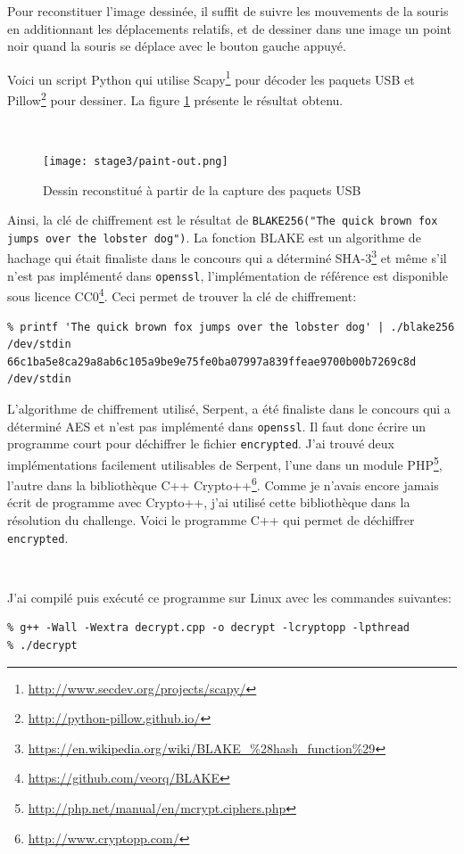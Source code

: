 \documentclass[a4paper,10pt]{article}
\newcommand{\pyinput}[1]{%
    \noindent{\color[rgb]{0.5, 0.5, 0.5}{\rule{\textwidth}{0.4pt}}}
     \\
    \noindent{\color[rgb]{0.5, 0.5, 0.5}{\rule{\textwidth}{0.4pt}}}
}
\begin{document}
Pour reconstituer l'image dessinée, il suffit de suivre les mouvements de la souris en additionnant les déplacements relatifs, et de dessiner dans une image un point noir quand la souris se déplace avec le bouton gauche appuyé.

Voici un script Python qui utilise Scapy\footnote{\url{http://www.secdev.org/projects/scapy/}} pour décoder les paquets USB et Pillow\footnote{\url{http://python-pillow.github.io/}} pour dessiner. La figure \ref{fig-paint-out} présente le résultat obtenu.

\pyinput{stage3/decode_paint.py.inc.tex}

\begin{figure}[ht]
  \centering
  \texttt{[image: stage3/paint-out.png]}
  \caption{Dessin reconstitué à partir de la capture des paquets USB}
  \label{fig-paint-out}
\end{figure}

Ainsi, la clé de chiffrement est le résultat de \texttt{BLAKE256("The quick brown fox jumps over the lobster dog")}.
La fonction BLAKE est un algorithme de hachage qui était finaliste dans le concours qui a déterminé SHA-3\footnote{\url{https://en.wikipedia.org/wiki/BLAKE_\%28hash_function\%29}} et même s'il n'est pas implémenté dans \texttt{openssl}, l'implémentation de référence est disponible sous licence CC0\footnote{\url{https://github.com/veorq/BLAKE}}.
Ceci permet de trouver la clé de chiffrement:
\begin{verbatim}
% printf 'The quick brown fox jumps over the lobster dog' | ./blake256 /dev/stdin
66c1ba5e8ca29a8ab6c105a9be9e75fe0ba07997a839ffeae9700b00b7269c8d /dev/stdin
\end{verbatim}

L'algorithme de chiffrement utilisé, Serpent, a été finaliste dans le concours qui a déterminé AES et n'est pas implémenté dans \texttt{openssl}.
Il faut donc écrire un programme court pour déchiffrer le fichier \texttt{encrypted}.
J'ai trouvé deux implémentations facilement utilisables de Serpent, l'une dans un module PHP\footnote{\url{http://php.net/manual/en/mcrypt.ciphers.php}}, l'autre dans la bibliothèque C++ Crypto++\footnote{\url{http://www.cryptopp.com/}}.
Comme je n'avais encore jamais écrit de programme avec Crypto++, j'ai utilisé cette bibliothèque dans la résolution du challenge.
Voici le programme C++ qui permet de déchiffrer \texttt{encrypted}.

\pyinput{stage3/decrypt.cpp.inc.tex}

J'ai compilé puis exécuté ce programme sur Linux avec les commandes suivantes:
\begin{verbatim}
% g++ -Wall -Wextra decrypt.cpp -o decrypt -lcryptopp -lpthread
% ./decrypt
\end{verbatim}
\end{document}
